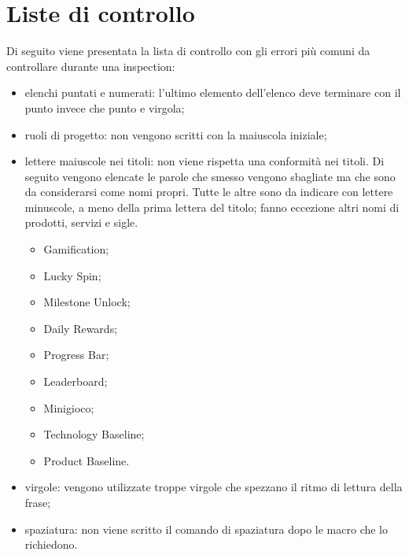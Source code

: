 \section {Liste di controllo}
Di seguito viene presentata la lista di controllo con gli errori più comuni da controllare
durante una inspection\glo:

\begin{itemize}
		\item elenchi puntati e numerati: l'ultimo elemento dell'elenco deve terminare con il punto invece che punto e virgola;
		\item ruoli di progetto: non vengono scritti con la maiuscola iniziale;
		\item lettere maiuscole nei titoli: non viene rispetta una conformità nei titoli. Di seguito vengono elencate le parole che smesso vengono sbagliate ma che sono da considerarsi come nomi propri. Tutte le altre sono da indicare con lettere minuscole, a meno della prima lettera del titolo; fanno eccezione altri nomi di prodotti, servizi e sigle.
		\begin{itemize}
			\item Gamification;
			\item Lucky Spin;
			\item Milestone Unlock;
			\item Daily Rewards;
			\item Progress Bar;
			\item Leaderboard;
			\item Minigioco;
			\item Technology Baseline;
			\item Product Baseline.
		\end{itemize}
		\item virgole: vengono utilizzate troppe virgole che spezzano il ritmo di lettura della
frase;
		\item spaziatura: non viene scritto il comando di spaziatura dopo le macro che lo
richiedono.
	
\end{itemize}